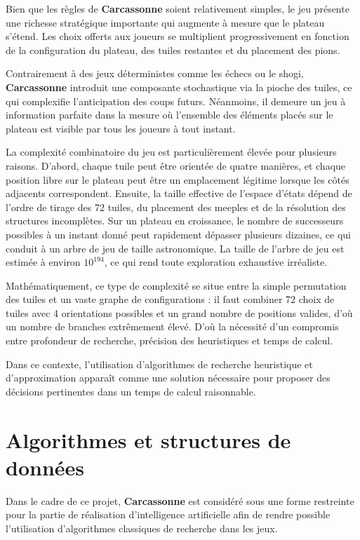 \documentclass[11pt]{article}
\begin{document}
Bien que les règles de \textbf{Carcassonne} soient relativement simples, le jeu présente une richesse stratégique importante qui augmente à mesure que le plateau s’étend. 
Les choix offerts aux joueurs se multiplient progressivement en fonction de la configuration du plateau, des tuiles restantes et du placement des pions.

Contrairement à des jeux déterministes comme les échecs ou le shogi, \textbf{Carcassonne} introduit une composante stochastique via la pioche des tuiles, ce qui complexifie l’anticipation des coups futurs. 
Néanmoins, il demeure un jeu à information parfaite dans la mesure où l’ensemble des éléments placés sur le plateau est visible par tous les joueurs à tout instant.

La complexité combinatoire du jeu est particulièrement élevée pour plusieurs raisons. D’abord, chaque tuile peut être orientée de quatre manières, et chaque position libre sur le plateau peut être un emplacement légitime lorsque les côtés adjacents correspondent. Ensuite, la taille effective de l’espace d’états dépend de l’ordre de tirage des 72 tuiles, du placement des meeples et de la résolution des structures incomplètes. Sur un plateau en croissance, le nombre de successeurs possibles à un instant donné peut rapidement dépasser plusieurs dizaines, ce qui conduit à un arbre de jeu de taille astronomique. La taille de l’arbre de jeu est estimée à environ $10^{194}$\cite{heyden2009implementing}, ce qui rend toute exploration exhaustive irréaliste.

Mathématiquement, ce type de complexité se situe entre la simple permutation des tuiles et un vaste graphe de configurations : il faut combiner 72 choix de tuiles avec 4 orientations possibles et un grand nombre de positions valides, d’où un nombre de branches extrêmement élevé. D’où la nécessité d’un compromis entre profondeur de recherche, précision des heuristiques et temps de calcul.

Dans ce contexte, l’utilisation d’algorithmes de recherche heuristique et d’approximation apparaît comme une solution nécessaire pour proposer des décisions pertinentes dans un temps de calcul raisonnable.



\section{Algorithmes et structures de données}

Dans le cadre de ce projet, \textbf{Carcassonne} est considéré sous une forme restreinte pour la partie de réalisation d'intelligence artificielle afin de rendre possible l’utilisation d’algorithmes classiques de recherche dans les jeux.
\end{document}
